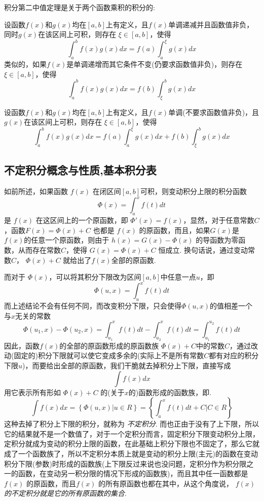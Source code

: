 积分第二中值定理是关于两个函数乘积的积分的:
\begin{theorem}[积分第二中值定理]
  设函数$f(x)$和$g(x)$均在$[a,b]$上有定义，且$f(x)$单调递减并且函数值非负，同时$g(x)$在该区间上可积，则存在 $\xi \in [a,b]$，使得
  \[ \int_a^{b} f(x)g(x)dx=f(a)\int_a^{\xi}g(x)dx \]
  类似的，如果$f(x)$是单调递增而其它条件不变(仍要求函数值非负)，则存在$\xi \in [a,b]$，使得
  \[ \int_a^{b} f(x)g(x)dx=f(b)\int_{\xi}^{b}g(x)dx \]
\end{theorem}

\begin{inference}
  设函数$f(x)$和$g(x)$均在$[a,b]$上有定义，且$f(x)$单调(不要求函数值非负)，且$g(x)$在该区间上可积，则存在 $\xi \in [a,b]$，使得
  \[ \int_a^{b}f(x)g(x)dx = f(a)\int_a^{\xi}g(x)dx+f(b)\int_{\xi}^{b}g(x)dx \]
\end{inference}


\subsection{不定积分概念与性质,基本积分表}
\label{sec:indefinite-integral}

如前所述，如果函数 $f(x)$ 在闭区间$[a,b]$可积，则变动积分上限的积分函数
\[ \Phi(x) = \int_a^x f(t) dt \]
是 $f(x)$ 在这区间上的一个原函数，即 $\Phi'(x) = f(x)$，显然，对于任意常数$C$，函数$F(x) = \Phi(x)+C$ 也都是 $f(x)$ 的原函数，而且，如果$G(x)$是 $f(x)$的任意一个原函数，则由于 $h(x)=G(x) - \Phi(x)$ 的导函数为零函数，从而存在常数$C$，使得 $G(x) = \Phi(x)+C$ 恒成立. 换句话说，通过变动常数$C$， $\Phi(x)+C$ 就给出了$f(x)$全部的原函数.

而对于 $\Phi(x)$，可以将其积分下限改为区间$[a,b]$中任意一点$u$，即
\[ \Phi(u,x) = \int_u^x f(t) dt \]
而上述结论不会有任何不同，而改变积分下限，只会使得$\Phi(u,x)$的值相差一个与$x$无关的常数
\[ \Phi(u_1,x)-\Phi(u_2,x) = \int_{u_1}^x f(t) dt - \int_{u_2}^x f(t) dt = \int_{u_1}^{u_2} f(t) dt \]
因此，函数$f(x)$的全部的原函数形成的原函数族 $\Phi(x)+C$中的常数$C$，通过改动(固定的)积分下限就可以使它变成多余的(实际上不是所有常数$C$都有对应的积分下限$u$)，而要给出全部的原函数，我们干脆就去掉积分上下限，直接写成
\[ \int f(x) dx \]
用它表示所有形如 $\Phi(x)+C$ 的(关于$x$的)函数形成的函数族，即.
\[ \int f(x) dx = \left\{ \Phi(u,x) \left|  \right. u \in R \right\} = \left\{ \int_a^x f(t) dt +C \left| C \in R \right. \right\} \]
这种去掉了积分上下限的积分，就称为 \emph{不定积分}. 而也正由于没有了上下限，所以它的结果就不是一个数值了，对于一个定积分而言，固定积分下限变动积分上限，定积分就成为变动的积分上限的函数，在此基础上积分下限也不固定了，那么它就成了一个函数族了，所以不定积分本质上就是变动的积分上限(主元)的函数在变动积分下限(参数)时形成的函数族(上下限反过来说也没问题，定积分作为积分限之一的函数，在变动另一积分限的情况下形成的函数族)，而且其中任一函数都是 $f(x)$ 的原函数，而且$f(x)$ 的所有原函数也都在其中，从这个角度说，\emph{ $f(x)$的不定积分就是它的所有原函数的集合}.












